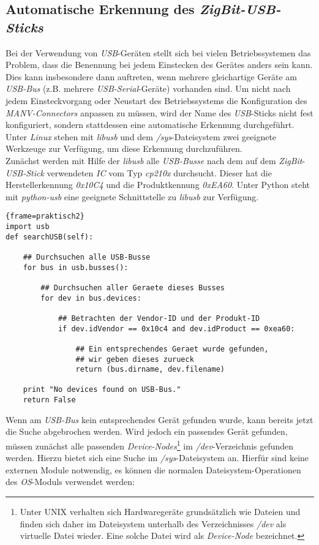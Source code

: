\subsection{Automatische Erkennung des \emph{ZigBit-USB-Sticks}}\label{usb_stick_erkennen}
Bei der Verwendung von \emph{USB}-Geräten stellt sich bei vielen Betriebssystemen das Problem,
dass die Benennung bei jedem Einstecken des Gerätes anders sein kann. Dies kann insbesondere
dann auftreten, wenn mehrere gleichartige Geräte am \emph{USB-Bus} (z.B. mehrere 
\emph{USB-Serial}-Geräte) vorhanden sind. Um nicht nach jedem Einsteckvorgang oder Neustart des Betriebssystems die
Konfiguration des \emph{MANV-Connectors} anpassen zu müssen, wird der Name des \emph{USB}-Sticks
nicht fest konfiguriert, sondern stattdessen eine automatische Erkennung durchgeführt.
Unter \emph{Linux} stehen mit \emph{libusb} und dem \emph{/sys}-Dateisystem zwei geeignete Werkzeuge
zur Verfügung, um diese Erkennung durchzuführen.\\
Zunächst werden mit Hilfe der \emph{libusb} alle \emph{USB-Busse} nach dem auf dem \emph{ZigBit}-\emph{USB-Stick}
verwendeten \emph{IC} vom Typ \emph{cp210x} durchsucht. Dieser hat die Herstellerkennung \emph{0x10C4} und die
Produktkennung \emph{0xEA60}. Unter Python steht mit \emph{python-usb} eine geeignete Schnittstelle zu
\emph{libusb} zur Verfügung.

\begin{lstlisting}{frame=praktisch2}
import usb
def searchUSB(self):

    ## Durchsuchen alle USB-Busse 
    for bus in usb.busses():

        ## Durchsuchen aller Geraete dieses Busses
        for dev in bus.devices:

            ## Betrachten der Vendor-ID und der Produkt-ID
            if dev.idVendor == 0x10c4 and dev.idProduct == 0xea60:
               
                ## Ein entsprechendes Geraet wurde gefunden,
                ## wir geben dieses zurueck 
                return (bus.dirname, dev.filename)
   
    print "No devices found on USB-Bus."
    return False
\end{lstlisting}

Wenn am \emph{USB-Bus} kein entsprechendes Gerät gefunden wurde, kann bereits jetzt die Suche abgebrochen werden.
Wird jedoch ein passendes Gerät gefunden, müssen zunächst alle passenden \emph{Device-Nodes}\footnote{Unter UNIX
verhalten sich Hardwaregeräte grundsätzlich wie Dateien und finden sich daher im Dateisystem unterhalb
des Verzeichnisses \emph{/dev} als virtuelle Datei wieder. Eine solche Datei wird als \emph{Device-Node} bezeichnet.} im
\emph{/dev}-Verzeichnis gefunden werden. Hierzu bietet sich eine Suche im \emph{/sys}-Dateisystem an. Hierfür sind keine
externen Module notwendig, es können die normalen Dateisystem-Operationen des \emph{OS}-Moduls verwendet werden:

